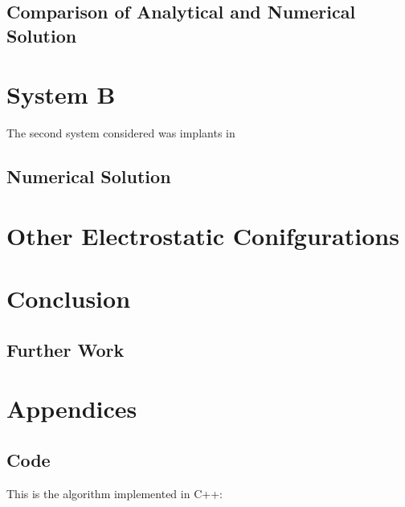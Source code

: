 \documentclass{article}
\begin{document}
\subsection{Comparison of Analytical and Numerical Solution}

\section{System B}
The second system considered was implants in 
\subsection{Numerical Solution}

\section{Other Electrostatic Conifgurations}

\section{Conclusion}

\subsection{Further Work}



\appendix
\section{Appendices}
\subsection{Code} \label{app:code}
This is the algorithm implemented in C++:
%
\end{document}
